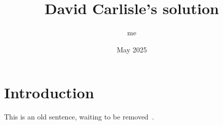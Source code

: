 \documentclass{article}
\title{David Carlisle's solution}
\author{me}
\date{May 2025}
\begin{document}
\maketitle

\section{Introduction}
This is an old sentence, waiting to be removed~\cite{Hirt1974}.



\end{document}
